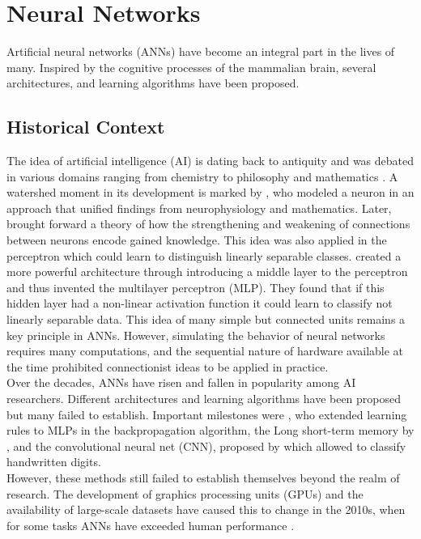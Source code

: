 \documentclass[a4paper,cleardoubleempty,BCOR1cm, 11pt]{report}
\begin{document}
\section{Neural Networks}
Artificial neural networks (ANNs) have become an integral part in the lives of many. Inspired by the cognitive processes of the mammalian brain, several architectures, and learning algorithms have been proposed.

\subsection{Historical Context}
The idea of artificial intelligence (AI) is dating back to antiquity and was debated in various domains ranging from chemistry \cite{o1994alchemical} to philosophy and mathematics \cite{leibnizdissertatio}. A watershed moment in its development is marked by \citet{mcculloch1943logical}, who modeled a neuron in an approach that unified findings from neurophysiology and mathematics. Later, \citet{hebb19680} brought forward a theory of how the strengthening and weakening of connections between neurons encode gained knowledge.  This idea was also applied in the perceptron \cite{rosenblatt1960perceptron} which could learn to distinguish linearly separable classes. 
\citet{marvin1969perceptrons} created a more powerful architecture through introducing a middle layer to the perceptron and thus invented the multilayer perceptron (MLP). They found that if this hidden layer had a non-linear activation function it could learn to classify not linearly separable data. This idea of many simple but connected units remains a key principle in ANNs.
However, simulating the behavior of neural networks requires many computations, and the sequential nature of hardware available at the time prohibited connectionist ideas to be applied in practice.\\
Over the decades, ANNs have risen and fallen in popularity among AI researchers. Different architectures and learning algorithms have been proposed but many failed to establish. Important milestones were \citet{rumelhart1986learning}, who extended learning rules to MLPs in the backpropagation algorithm, the Long short-term memory by \citet{hochreiter1997long}, and the convolutional neural net (CNN), proposed by \citet{lecun1995convolutional} which allowed to classify handwritten digits.\\
However, these methods still failed to establish themselves beyond the realm of research. The development of graphics processing units (GPUs) and the availability of large-scale datasets have caused this to change in the 2010s, when for some tasks ANNs have exceeded human performance \cite{ILSVRC15}.
\end{document}
